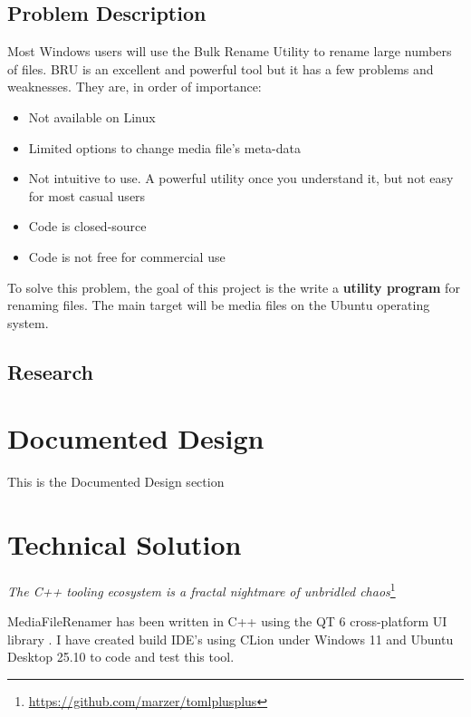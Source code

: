 \documentclass[11pt]{article}
\begin{document}
\subsection{Problem Description}
Most Windows users will use the Bulk Rename Utility\cite{BulkRenameUtility} to rename large numbers of files.
BRU is an excellent and powerful tool but it has a few problems and weaknesses. They are, in order of importance:
\begin{itemize}
    \item Not available on Linux
    \item Limited options to change media file's meta-data
    \item Not intuitive to use. A powerful utility once you understand it, but not easy for most casual users
    \item Code is closed-source
    \item Code is not free for commercial use
\end{itemize}
To solve this problem, the goal of this project is the write a \textbf{utility program} for renaming files. The main target will be media files on the Ubuntu operating system.

\subsection{Research}



\section{Documented Design}
This is the Documented Design section




\section{Technical Solution}

\begin{center}
\textit{The C++ tooling ecosystem is a fractal nightmare of unbridled chaos}\footnote{\url{https://github.com/marzer/tomlplusplus}}
\end{center}

\vspace*{0.25cm}

MediaFileRenamer has been written in C++ using the QT 6 cross-platform UI library \cite{QT}.
I have created build IDE's using CLion under Windows 11 and Ubuntu Desktop 25.10 to code and test this tool.
\end{document}

